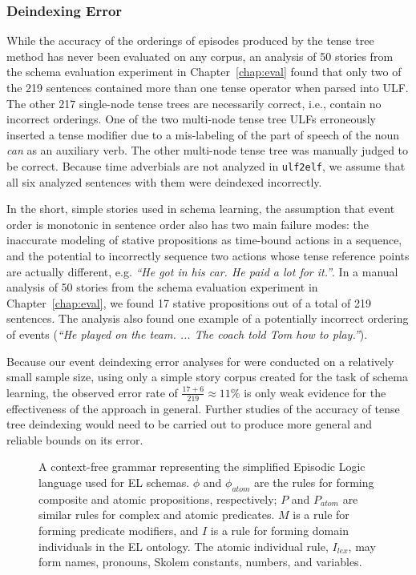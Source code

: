\subsubsection{Deindexing Error}
\label{sec:deindexing_error}
While the accuracy of the orderings of episodes produced by the tense tree method has never been evaluated on any corpus, an analysis of 50 stories from the schema evaluation experiment in Chapter~\ref{chap:eval} found that only two of the 219 sentences contained more than one tense operator when parsed into ULF. The other 217 single-node tense trees are necessarily correct, i.e., contain no incorrect orderings. One of the two multi-node tense tree ULFs erroneously inserted a tense modifier due to a mis-labeling of the part of speech of the noun \textit{can} as an auxiliary verb. The other multi-node tense tree was manually judged to be correct. Because time adverbials are not analyzed in \texttt{ulf2elf}, we assume that all six analyzed sentences with them were deindexed incorrectly.

In the short, simple stories used in schema learning, the assumption that event order is monotonic in sentence order also has two main failure modes: the inaccurate modeling of stative propositions as time-bound actions in a sequence, and the potential to incorrectly sequence two actions whose tense reference points are actually different, e.g. \textit{``He got in his car. He paid a lot for it.''}. In a manual analysis of 50 stories from the schema evaluation experiment in Chapter~\ref{chap:eval}, we found 17 stative propositions out of a total of 219 sentences. The analysis also found one example of a potentially incorrect ordering of events (\textit{``He played on the team. ... The coach told Tom how to play.''}).

Because our event deindexing error analyses for were conducted on a relatively small sample size, using only a simple story corpus created for the task of schema learning, the observed error rate of $\frac{17+6}{219} \approx 11\%$ is only weak evidence for the effectiveness of the approach in general. Further studies of the accuracy of tense tree deindexing would need to be carried out to produce more general and reliable bounds on its error.

\begin{figure}
    \centering
    
    \normalsize
    \caption{A context-free grammar representing the simplified Episodic Logic language used for EL schemas. $\phi$ and $\phi_{atom}$ are the rules for forming composite and atomic propositions, respectively; $P$ and $P_{atom}$ are similar rules for complex and atomic predicates. $M$ is a rule for forming predicate modifiers, and $I$ is a rule for forming domain individuals in the EL ontology. The atomic individual rule, $I_{lex}$, may form names, pronouns, Skolem constants, numbers, and variables.}
    \label{fig:el_cfg}
\end{figure}

